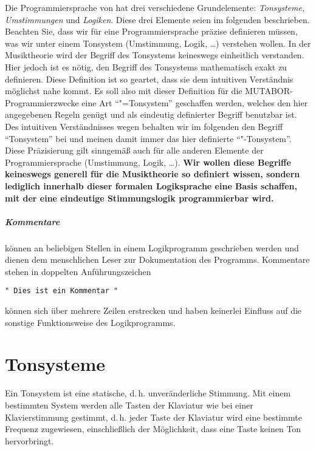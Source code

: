 Die Programmiersprache von \mutabor{} hat drei verschiedene
Grundelemente: \emph{Tonsysteme, Umstimmungen\/} und \emph{Logiken\/}.
Diese drei Elemente seien im folgenden beschrieben.  Beachten Sie, dass
wir für eine Programmiersprache präzise definieren müssen, was wir
unter einem Tonsystem (Umstimmung, Logik, \dots) verstehen wollen. In
der Musiktheorie wird der Begriff des Tonsystems
keineswegs einheitlich verstanden. Hier jedoch ist es nötig, den
Begriff des Tonsystems mathematisch exakt zu definieren. Diese
Definition ist so geartet, dass sie dem intuitiven Verständnis
möglichst nahe kommt. Es soll also mit dieser Definition für die
MU\-TA\-BOR-Pro\-gram\-mier\-zwecke eine Art "`\mutabor{}"=Tonsystem"'
geschaffen werden, welches den hier
angegebenen Regeln genügt und als eindeutig definierter Begriff
benutzbar ist. Des intuitiven Verständnisses wegen behalten wir im
folgenden den Begriff "`Tonsystem"' bei und meinen damit immer das
hier definierte "`\mutabor{}"-Tonsystem"'. Diese Präzisierung gilt
sinngemäß auch für alle anderen Elemente der Programmiersprache
(Umstimmung, Logik, \dots).  \textbf{Wir wollen diese Begriffe keineswegs
  generell für die Musiktheorie so definiert wissen, sondern lediglich
  innerhalb dieser formalen Logiksprache eine Basis schaffen, mit der
  eine eindeutige Stimmungslogik programmierbar wird.}

\paragraph{Kommentare}  können an beliebigen Stellen
in einem Logikprogramm
geschrieben werden und dienen dem menschlichen Leser zur 
Dokumentation des Programms. Kommentare stehen in 
doppelten Anführungszeichen 
\begin{verbatim} 
" Dies ist ein Kommentar " 
\end{verbatim}
können sich über mehrere Zeilen erstrecken und haben keinerlei Einfluss
auf die sonstige Funktionsweise des Logikprogramms.

\chapter{Tonsysteme}\label{cha:tonsysteme}
Ein Tonsystem ist eine statische, d.\,h. unveränderliche Stimmung.
Mit einem bestimmten System werden alle Tasten der Klaviatur wie
bei einer Klavierstimmung gestimmt, d.\,h. jeder Taste der Klaviatur
wird eine bestimmte Frequenz zugewiesen, einschließlich der
Möglichkeit, dass eine Taste keinen Ton hervorbringt.

